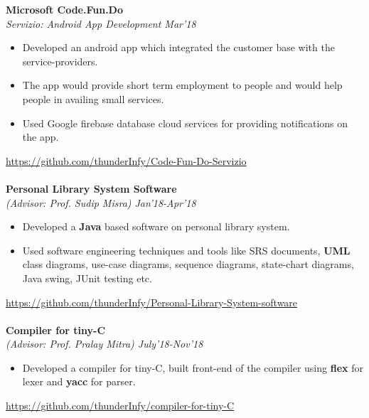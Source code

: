 \documentclass[letter,10pt]{book}
\begin{document}
\pagebreak
\hspace{-1.5em}\large \textbf{Microsoft Code.Fun.Do} \normalsize\\
\emph{Servizio: Android App Development \hfill Mar'18} \\[-2em]
\begin{itemize}
\item Developed an android app which integrated the customer base with the service-providers.\\[-2em]
\item The app would provide short term employment to people and would help people in availing small services.\\[-2em]
\item Used Google firebase database cloud services for providing notifications on the app.\\[-1.8em]
\end{itemize}
\href{https://github.com/thunderInfy/Code-Fun-Do-Servizio}{https://github.com/thunderInfy/Code-Fun-Do-Servizio}
\\\\
\large \textbf{Personal Library System Software} \normalsize\\
\emph{(Advisor: Prof. Sudip Misra) \hfill Jan'18-Apr'18} \\[-2em]
\begin{itemize}
\item Developed a  \textbf{Java} based software on personal library system. \\[-2em]
\item Used software engineering techniques and tools like SRS documents, \textbf{UML} class diagrams, use-case diagrams, sequence diagrams, state-chart diagrams, Java swing, JUnit testing etc.\\[-1.8em]
\end{itemize}
\href{https://github.com/thunderInfy/Personal-Library-System-software}{https://github.com/thunderInfy/Personal-Library-System-software}
\\\\
\large \textbf{Compiler for tiny-C} \normalsize\\
\emph{(Advisor: Prof. Pralay Mitra) \hfill July'18-Nov'18} \\[-2em]
\begin{itemize} 
\item Developed a compiler for tiny-C, built front-end of the compiler using  \textbf{flex} for lexer and  \textbf{yacc} for parser.\\[-1.8em]
\end{itemize}
\href{https://github.com/thunderInfy/compiler-for-tiny-C}{https://github.com/thunderInfy/compiler-for-tiny-C}
\\
\end{document}
